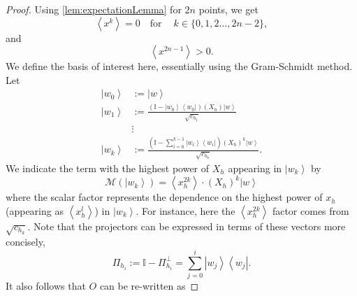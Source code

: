 \documentclass{article}
\begin{document}
\begin{proof}
  Using \cref{lem:expectationLemma} for $2n$ points, we get
  \begin{equation}
    \left\langle x^{k}\right\rangle =0\ \ \  \text{ for }\ \ \ \  k\in\{0,1,2\dots,2n-2\},\label{eq:Mochonsf0equality}
  \end{equation}
  and
  \begin{equation}
    \left\langle x^{2n-1}\right\rangle >0.\label{eq:Mochonsf0Positivity}
  \end{equation}
  We define the basis of interest here, essentially using the Gram-Schmidt
  method. Let
  \begin{align}
    \left|w_{0}\right\rangle & :=\left|w\right\rangle \nonumber                                                                                                                                     \\
    \left|w_{1}\right\rangle & :=\frac{\left(\mathbb{I}-\left|w_{0}\right\rangle \left\langle w_{0}\right|\right)(X_{h})\left|w\right\rangle }{\sqrt{c_{h_{1}}}}\nonumber                           \\
                             & \vdots\nonumber                                                                                                                                                      \\
    \left|w_{k}\right\rangle & :=\frac{\left(\mathbb{I}-\sum_{i=0}^{k-1}\left|w_{i}\right\rangle \left\langle w_{i}\right|\right)(X_{h})^{k}\left|w\right\rangle }{\sqrt{c_{h_{k}}}}.\label{eq:w_k}
  \end{align}
  We indicate the term with the highest power of $X_{h}$ appearing
  in $\left|w_{k}\right\rangle $ by
  \begin{displaymath}
    \mathcal{M}(\left|w_{k}\right\rangle )=\left\langle x_{h}^{2k}\right\rangle \cdot(X_{h})^{k}\left|w\right\rangle
  \end{displaymath}
  where the scalar factor represents the dependence on the
  highest power of $x_{h}$ (appearing as $\left\langle x_{h}^{l}\right\rangle $)
  in $\left|w_{k}\right\rangle $. For instance, here the $\left\langle x_{h}^{2k}\right\rangle $
  factor comes from $\sqrt{c_{h_{k}}}$. Note that the projectors can
  be expressed in terms of these vectors more concisely,
  \begin{displaymath}
    \Pi_{h_{i}}:=\mathbb{I}-\Pi_{h_{i}}^{\perp}=\sum_{j=0}^{i}\left|w_{j}\right\rangle \left\langle w_{j}\right|.
  \end{displaymath}
  It also follows that $O$ can be re-written as

\end{proof}
\end{document}
